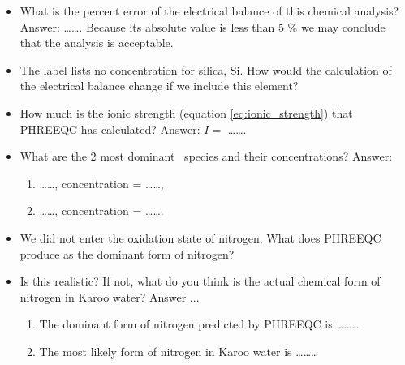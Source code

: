 \begin{itemize}

\item What is the percent error of the electrical balance of this chemical analysis? Answer: \ldots\ldots. Because its absolute value is less than 5 \% we may conclude that the analysis is acceptable.

\item The label lists no concentration for silica, Si. How would the calculation of the electrical balance change if we include this element?

\item How much is the ionic strength (equation \ref{eq:ionic_strength}) that PHREEQC has calculated? Answer: $I =$ \ldots\ldots.

\item What are the 2 most dominant \ca\ species and their concentrations? Answer: 

\begin{enumerate}
\item \ldots\ldots, concentration = \ldots\ldots, 

\item \ldots\ldots, concentration = \ldots\ldots.
\end{enumerate}


\item We did not enter the oxidation state of nitrogen. What does PHREEQC produce as the dominant form of nitrogen?  

\item Is this realistic? If not, what do you think is the actual chemical form of nitrogen in Karoo water? Answer ...


\begin{enumerate}
\item The dominant form of nitrogen predicted by PHREEQC is \ldots\ldots\ldots 

\item The most likely form of nitrogen in Karoo water is \ldots\ldots\ldots

\end{enumerate}

\end{itemize}


\newpage
